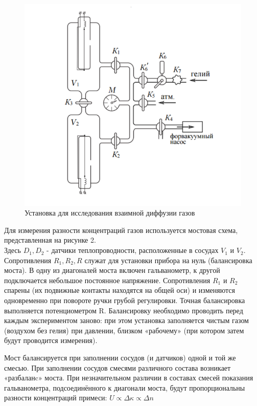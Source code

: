 \documentclass[a4paper, 12pt]{article}
\begin{document}
\begin{center}
\begin{figure}[H]
    \centering
    \includegraphics[width=9.5 cm]{facility.PNG}
    \caption{Установка для исследования взаимной диффузии газов}
    \label{fig:vac}
\end{figure}

\item Для измерения разности концентраций газов используется мостовая схема, представленная на рисунке 2. \\
Здесь $D_1, D_2$ - датчики теплопроводности, расположенные в сосудах $V_1$ и $V_2$. Сопротивления $R_1, R_2, R$ служат для установки прибора на нуль (балансировка моста). В одну из диагоналей моста включен гальванометр, к другой подключается небольшое постоянное напряжение. Сопротивления $R_1$ и $R_2$ спарены (их подвижные контакты находятся на общей оси) и изменяются одновременно при повороте ручки грубой регулировки. Точная балансировка выполняется потенциометром R. Балансировку необходимо проводить перед каждым экспериментом заново: при этом установка заполняется чистым газом (воздухом без гелия) при давлении, близком «рабочему» (при котором затем будут проводится измерения).

 Мост балансируется при заполнении сосудов (и датчиков) одной и той же смесью. При заполнении сосудов смесями различного состава возникает «разбаланc» моста. При незначительном различии в составах смесей показания гальванометра, подсоединённого к диагонали моста, будут пропорциональны разности концентраций примеси: $U \propto \Delta \kappa \propto \Delta n$
 

\end{center}
\end{document}
